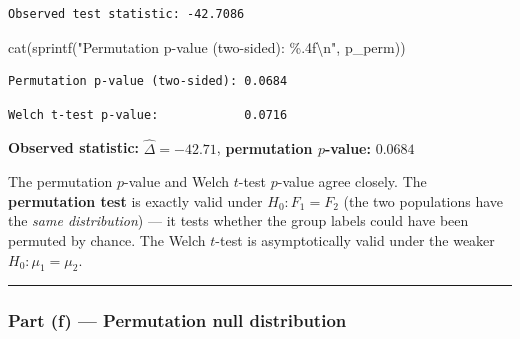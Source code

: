 \documentclass[
  letterpaper,
  DIV=11,
  numbers=noendperiod]{scrartcl}
\newenvironment{Shaded}{\begin{snugshade}}{\end{snugshade}}
\newcommand{\FunctionTok}[1]{\textcolor[rgb]{0.28,0.35,0.67}{#1}}
\newcommand{\NormalTok}[1]{\textcolor[rgb]{0.00,0.23,0.31}{#1}}
\newcommand{\SpecialCharTok}[1]{\textcolor[rgb]{0.37,0.37,0.37}{#1}}
\newcommand{\StringTok}[1]{\textcolor[rgb]{0.13,0.47,0.30}{#1}}
\begin{document}
\begin{verbatim}
Observed test statistic: -42.7086
\end{verbatim}

\begin{Shaded}
\begin{Highlighting}[]
\FunctionTok{cat}\NormalTok{(}\FunctionTok{sprintf}\NormalTok{(}\StringTok{"Permutation p{-}value (two{-}sided): \%.4f}\SpecialCharTok{\textbackslash{}n}\StringTok{"}\NormalTok{, p\_perm))}
\end{Highlighting}
\end{Shaded}

\begin{verbatim}
Permutation p-value (two-sided): 0.0684
\end{verbatim}

\begin{Shaded}
\end{Shaded}

\begin{verbatim}
Welch t-test p-value:            0.0716
\end{verbatim}

\textbf{Observed statistic:} \(\hat{\Delta} = -42.71\),
\textbf{permutation \(p\)-value:} \(0.0684\)

The permutation \(p\)-value and Welch \(t\)-test \(p\)-value agree
closely. The \textbf{permutation test} is exactly valid under
\(H_0: F_1 = F_2\) (the two populations have the \emph{same
distribution}) --- it tests whether the group labels could have been
permuted by chance. The Welch \(t\)-test is asymptotically valid under
the weaker \(H_0: \mu_1 = \mu_2\).

\begin{center}\rule{0.5\linewidth}{0.5pt}\end{center}

\subsubsection{Part (f) --- Permutation null
distribution}\label{part-f-permutation-null-distribution}
\end{document}
